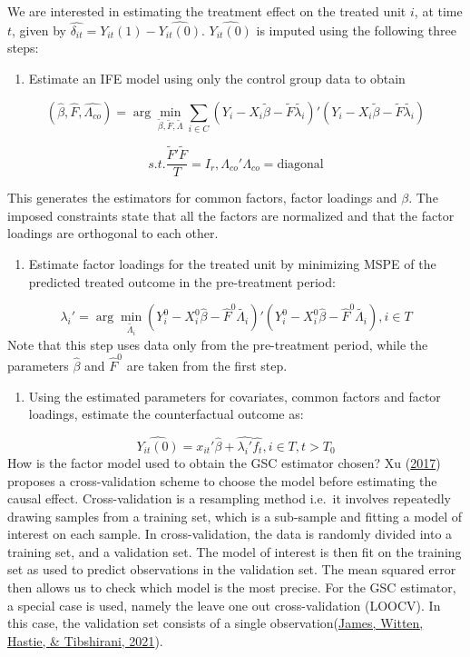 \documentclass[12pt,nobind, a4paper]{reedthesis}
\providecommand{\tightlist}{%
	\setlength{\itemsep}{0pt}\setlength{\parskip}{0pt}}
\begin{document}
 We are interested in estimating the treatment effect on the treated unit \(i\), at time \(t\), given by \(\hat{\delta_{it}}= Y_{it}(1)-\hat{Y_{it}(0)}\). \(\hat{Y_{it}(0)}\) is imputed using the following three steps:
 \linebreak
 \begin{enumerate}
 \def\labelenumi{\arabic{enumi}.}
 \tightlist
 \item
   Estimate an IFE model using only the control group data to obtain
 \end{enumerate}
 \[(\hat{\beta},\hat{F},\hat{\Lambda_{co}})=\arg\min_{\tilde{\beta},\tilde{F},\tilde{\Lambda}}\sum_{i\in C}(Y_{i}-X_{i} \tilde{\beta}-\tilde{F}\tilde{\lambda_{i}})'(Y_{i}-X_{i}\tilde{\beta}-\tilde{F}\tilde{\lambda_{i}})\]

 \[s.t. \frac{\tilde{F}'\tilde{F}}{T}=I_{r}
 , \Lambda_{co}'\Lambda_{co}=\text{diagonal}\]

 This generates the estimators for common factors, factor loadings and \(\beta\). The imposed constraints state that all the factors are normalized and that the factor loadings are orthogonal to each other.
 \begin{enumerate}
 \def\labelenumi{\arabic{enumi}.}
 \setcounter{enumi}{1}
 \tightlist
 \item
   Estimate factor loadings for the treated unit by minimizing MSPE of the predicted treated outcome in the pre-treatment period:
 \end{enumerate}
 \[\lambda_{i}'=\arg\min_{\tilde{\Lambda_{i}}} (Y_{i}^{0}-X_{i}^{0} \hat{\beta}-\hat{F}^{0}\tilde{\Lambda_{i}})'(Y_{i}^{0}-X_{i}^{0} \hat{\beta}-\hat{F}^{0}\tilde{\Lambda_{i}}), i \in T\]
 Note that this step uses data only from the pre-treatment period, while the parameters \(\hat{\beta}\) and \(\hat{F}^{0}\) are taken from the first step.
 \begin{enumerate}
 \def\labelenumi{\arabic{enumi}.}
 \setcounter{enumi}{2}
 \tightlist
 \item
   Using the estimated parameters for covariates, common factors and factor loadings, estimate the counterfactual outcome as:
 \end{enumerate}
 \[\hat{Y_{it}(0)}=x_{it}'\hat{\beta}+\hat{\lambda_{i}'}\hat{f_{t}},  i\in T, t>T_{0}\]
 How is the factor model used to obtain the GSC estimator chosen? Xu (\protect\hyperlink{ref-xu_generalized_2017}{2017}) proposes a cross-validation scheme to choose the model before estimating the causal effect. Cross-validation is a resampling method i.e.~it involves repeatedly drawing samples from a training set, which is a sub-sample and fitting a model of interest on each sample. In cross-validation, the data is randomly divided into a training set, and a validation set. The model of interest is then fit on the training set as used to predict observations in the validation set. The mean squared error then allows us to check which model is the most precise. For the GSC estimator, a special case is used, namely the leave one out cross-validation (LOOCV). In this case, the validation set consists of a single observation(\protect\hyperlink{ref-james_introduction_2021}{James, Witten, Hastie, \& Tibshirani, 2021}).
 \linebreak
\end{document}
